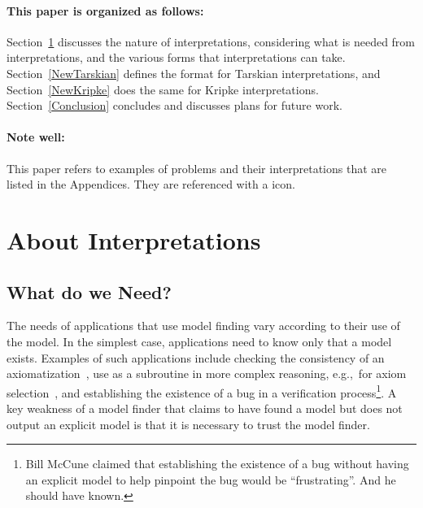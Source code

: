 \documentclass{easychair}
\newcommand{\example}{{\scriptsize \faFile[regular]}}
\begin{document}
\paragraph{This paper is organized as follows:}
Section~\ref{Interpretations} discusses the nature of interpretations, considering what is
needed from interpretations, and the various forms that interpretations can take.
Section~\ref{NewTarskian} defines the format for Tarskian interpretations, and
Section~\ref{NewKripke} does the same for Kripke interpretations.
Section~\ref{Conclusion} concludes and discusses plans for future work.

\paragraph{Note well:} 
This paper refers to examples of problems and their interpretations that are listed in the 
Appendices.
They are referenced with a \example{} icon.
 
\section{About Interpretations}
\label{Interpretations}

\subsection{What do we Need?}
\label{Need}

The needs of applications that use model finding vary according to their use of the model.
In the simplest case, applications need to know only that a model exists.
Examples of such applications include checking the consistency of an axiomatization~\cite{CI15},
use as a subroutine in more complex reasoning, e.g.,~for
axiom selection~\cite{SP07,Pud07-ESARLT}, and establishing the existence of a bug in a
verification process\footnote{%
Bill McCune claimed that establishing the existence of a bug without having an explicit model
to help pinpoint the bug would be ``frustrating''. And he should have known.}.
A key weakness of a model finder that claims to have found a model but does not output an 
explicit model is that it is necessary to trust the model finder.
\end{document}
